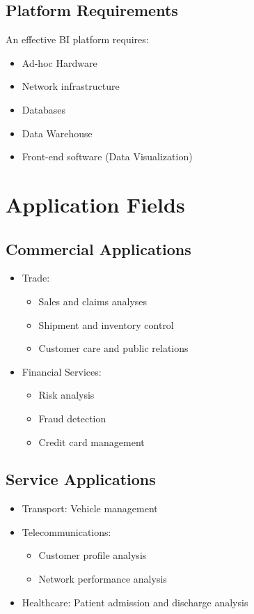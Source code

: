 \subsection{Platform Requirements}
An effective BI platform requires:
\begin{itemize}
    \item Ad-hoc Hardware
    \item Network infrastructure
    \item Databases
    \item Data Warehouse
    \item Front-end software (Data Visualization)
\end{itemize}

\section{Application Fields}

\subsection{Commercial Applications}
\begin{itemize}
    \item Trade:
        \begin{itemize}
            \item Sales and claims analyses
            \item Shipment and inventory control
            \item Customer care and public relations
        \end{itemize}
    \item Financial Services:
        \begin{itemize}
            \item Risk analysis
            \item Fraud detection
            \item Credit card management
        \end{itemize}
\end{itemize}

\subsection{Service Applications}
\begin{itemize}
    \item Transport: Vehicle management
    \item Telecommunications:
        \begin{itemize}
            \item Customer profile analysis
            \item Network performance analysis
        \end{itemize}
    \item Healthcare: Patient admission and discharge analysis
\end{itemize}

